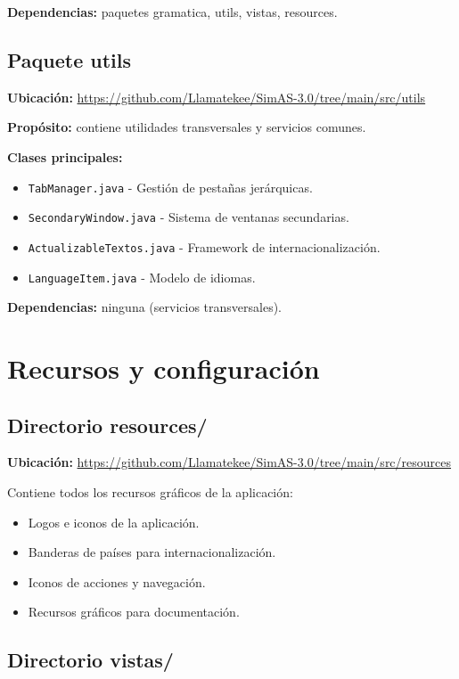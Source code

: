 \textbf{Dependencias:} paquetes gramatica, utils, vistas, resources.

\subsection{Paquete utils}

\textbf{Ubicación:} \url{https://github.com/Llamatekee/SimAS-3.0/tree/main/src/utils}

\textbf{Propósito:} contiene utilidades transversales y servicios comunes.

\textbf{Clases principales:}
\begin{itemize}
    \item \texttt{TabManager.java} - Gestión de pestañas jerárquicas.
    \item \texttt{SecondaryWindow.java} - Sistema de ventanas secundarias.
    \item \texttt{ActualizableTextos.java} - Framework de internacionalización.
    \item \texttt{LanguageItem.java} - Modelo de idiomas.
\end{itemize}

\textbf{Dependencias:} ninguna (servicios transversales).

\section{Recursos y configuración}

\subsection{Directorio resources/}

\textbf{Ubicación:} \url{https://github.com/Llamatekee/SimAS-3.0/tree/main/src/resources}

Contiene todos los recursos gráficos de la aplicación:
\begin{itemize}
    \item Logos e iconos de la aplicación.
    \item Banderas de países para internacionalización.
    \item Iconos de acciones y navegación.
    \item Recursos gráficos para documentación.
\end{itemize}

\subsection{Directorio vistas/}

